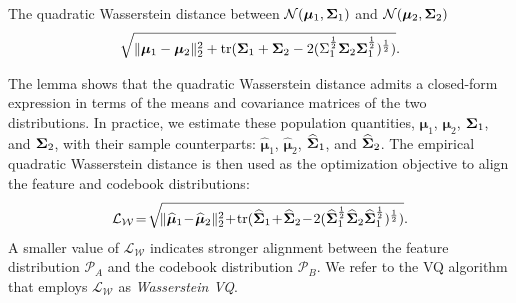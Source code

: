 \begin{lemma}\label{theorem:Wasserstein Distance}
The quadratic Wasserstein distance between $\mathcal{N}(\bm \mu_1, \mathbf{\Sigma}_1)$ and $\mathcal{N}(\bm \mu_2, \mathbf{\Sigma}_2)$ 
\begin{equation}\label{eq:wasserstein distance definition}
\sqrt{\Vert \bm \mu_1 - \bm \mu_2 \Vert^2_2 + \mathop{\mathrm{tr}}( {\mathbf{\Sigma}_1}+ {\mathbf{\Sigma}_2} - 2 (\Sigma_1^{\frac{1}{2}} {\mathbf{\Sigma}_2} \mathbf{\Sigma}_1^{\frac{1}{2}})^{\frac{1}{2}})}.
\end{equation}
\end{lemma}
The lemma shows that the quadratic Wasserstein distance admits a closed-form expression in terms of the means and covariance matrices of the two distributions.
In practice, we estimate these population quantities, ${\bm \mu}_{1}$, ${\bm \mu}_{2}$, ${\mathbf{\Sigma}}_{1}$, and ${\mathbf{\Sigma}}_{2}$, with their sample counterparts: $\hat {\bm \mu}_{1}$, $\hat {\bm \mu}_{2}$, $\widehat {\mathbf{\Sigma}}_{1}$, and $\widehat {\mathbf{\Sigma}}_{2}$. 
The empirical quadratic Wasserstein distance is then used as the optimization objective to align  the feature and codebook distributions:
\begin{equation}\label{eq:wasserstein distance}
\mathcal{L}_{\mathcal{W}}\! = \!\sqrt{\!\Vert \hat {\bm \mu}_{1} \!- \!\hat {\bm \mu}_{2} \Vert^2_2 \!+\! \tr( \hat {\m \Sigma}_{1}\!+\!\hat {\m \Sigma}_{2}\! -\!2(\hat {\m \Sigma}_{1}^{\frac{1}{2}} {\hat {\m \Sigma}_{2}} \hat {\m \Sigma}_{1}^{\frac{1}{2}})^{\frac{1}{2}})}. \nonumber
\end{equation}  
A smaller value of $\mathcal{L}_{\mathcal{W}}$ indicates stronger alignment between the feature distribution $\mathcal{P}_A$ and the codebook distribution $\mathcal{P}_B$. We refer to the VQ algorithm that employs $\mathcal{L}_{\mathcal{W}}$ as \emph{Wasserstein VQ}.

